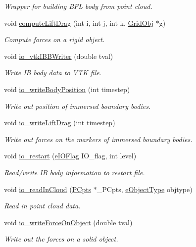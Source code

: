 \begin{DoxyCompactItemize}
\begin{DoxyCompactList}\small\item\em Wrapper for building B\+FL body from point cloud. \end{DoxyCompactList}\item 
void \hyperlink{class_object_manager_a6a35b34d77e7cd56060a6953d0d0860a}{compute\+Lift\+Drag} (int i, int j, int k, \hyperlink{class_grid_obj}{Grid\+Obj} $\ast$g)
\begin{DoxyCompactList}\small\item\em Compute forces on a rigid object. \end{DoxyCompactList}\item 
void \hyperlink{class_object_manager_a9bcee530acc6e99f80a53d7ddb757989}{io\+\_\+vtk\+I\+B\+B\+Writer} (double tval)
\begin{DoxyCompactList}\small\item\em Write IB body data to V\+TK file. \end{DoxyCompactList}\item 
void \hyperlink{class_object_manager_aca1fa71a37c8e02ebe40fdc932350c15}{io\+\_\+write\+Body\+Position} (int timestep)
\begin{DoxyCompactList}\small\item\em Write out position of immersed boundary bodies. \end{DoxyCompactList}\item 
void \hyperlink{class_object_manager_a7f3c0860b78203671cd858532492555d}{io\+\_\+write\+Lift\+Drag} (int timestep)
\begin{DoxyCompactList}\small\item\em Write out forces on the markers of immersed boundary bodies. \end{DoxyCompactList}\item 
void \hyperlink{class_object_manager_aaa4689c73e755a1214356154a76a06fa}{io\+\_\+restart} (\hyperlink{_grid_obj_8h_ad1926c22ad82853adff44c4b76b97827}{e\+I\+O\+Flag} I\+O\+\_\+flag, int level)
\begin{DoxyCompactList}\small\item\em Read/write IB body information to restart file. \end{DoxyCompactList}\item 
void \hyperlink{class_object_manager_a5c11d747c3df9e91d5fc2dac836d7b7e}{io\+\_\+read\+In\+Cloud} (\hyperlink{class_p_cpts}{P\+Cpts} $\ast$\+\_\+\+P\+Cpts, \hyperlink{_object_manager_8h_a7b78fa3db30dfb9c1efc82bf886fe184}{e\+Object\+Type} objtype)
\begin{DoxyCompactList}\small\item\em Read in point cloud data. \end{DoxyCompactList}\item 
void \hyperlink{class_object_manager_adf65260d81584613fa33f2e7658f1b36}{io\+\_\+write\+Force\+On\+Object} (double tval)
\begin{DoxyCompactList}\small\item\em Write out the forces on a solid object. \end{DoxyCompactList}\end{DoxyCompactItemize}
